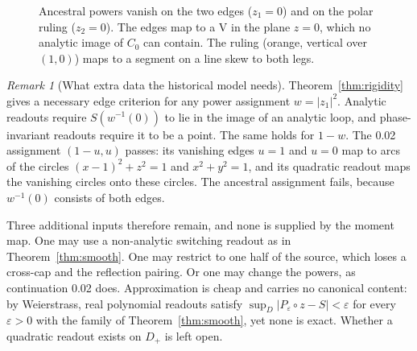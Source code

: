\documentclass[11pt]{article}
\theoremstyle{definition}\newtheorem{definition}[theorem]{Definition}
\theoremstyle{remark}\newtheorem{remark}[theorem]{Remark}
\begin{document}
\begin{figure}[t]\centering
{}
\caption{Ancestral powers vanish on the two edges ($z_1=0$) and on the polar
ruling ($z_2=0$). The edges map to a V in the plane $z=0$, which no analytic
image of $C_0$ can contain. The ruling (orange, vertical over $(1,0)$) maps to a
segment on a line skew to both legs.}\label{fig:edges}
\end{figure}

\begin{remark}[What extra data the historical model needs]\label{rem:data}
Theorem~\ref{thm:rigidity} gives a necessary edge criterion for any power
assignment $w=|z_1|^2$. Analytic readouts require $S(w^{-1}(0))$ to lie in the
image of an analytic loop, and phase-invariant readouts require it to be a
point. The same holds for $1-w$. The 0.02 assignment $(1-u,u)$ passes: its
vanishing edges $u=1$ and $u=0$ map to arcs of the circles $(x-1)^2+z^2=1$ and
$x^2+y^2=1$, and its quadratic readout maps the vanishing circles onto these
circles. The ancestral assignment fails, because $w^{-1}(0)$ consists of both edges.

Three additional inputs therefore remain, and none is supplied by the moment map.
One may use a non-analytic switching readout as in Theorem~\ref{thm:smooth}.
One may restrict to one half of the source, which loses a cross-cap and the
reflection pairing. Or one may change the powers, as continuation 0.02 does.
Approximation is cheap and carries no canonical content: by Weierstrass, real
polynomial readouts satisfy $\sup_D|P_\varepsilon\circ z-S|<\varepsilon$ for
every $\varepsilon>0$ with the family of Theorem~\ref{thm:smooth}, yet none is
exact. Whether a quadratic readout exists on $D_+$ is left open.
\end{remark}
\end{document}

